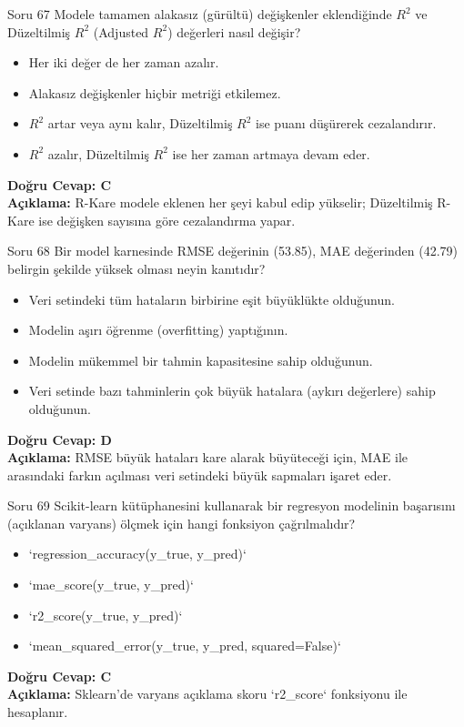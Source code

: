 \documentclass[12pt,a4paper]{article}
\begin{document}
\begin{testcard}{Soru 67}
    Modele tamamen alakasız (gürültü) değişkenler eklendiğinde $R^2$ ve Düzeltilmiş $R^2$ (Adjusted $R^2$) değerleri nasıl değişir?
    \begin{itemize}
        \item[A)] Her iki değer de her zaman azalır.
        \item[B)] Alakasız değişkenler hiçbir metriği etkilemez.
        \item[C)] $R^2$ artar veya aynı kalır, Düzeltilmiş $R^2$ ise puanı düşürerek cezalandırır.
        \item[D)] $R^2$ azalır, Düzeltilmiş $R^2$ ise her zaman artmaya devam eder.
    \end{itemize}
    \tcblower
    \textbf{Doğru Cevap: C} \\
    \textbf{Açıklama:} R-Kare modele eklenen her şeyi kabul edip yükselir; Düzeltilmiş R-Kare ise değişken sayısına göre cezalandırma yapar.
\end{testcard}

\begin{testcard}{Soru 68}
    Bir model karnesinde RMSE değerinin (53.85), MAE değerinden (42.79) belirgin şekilde yüksek olması neyin kanıtıdır?
    \begin{itemize}
        \item[A)] Veri setindeki tüm hataların birbirine eşit büyüklükte olduğunun.
        \item[B)] Modelin aşırı öğrenme (overfitting) yaptığının.
        \item[C)] Modelin mükemmel bir tahmin kapasitesine sahip olduğunun.
        \item[D)] Veri setinde bazı tahminlerin çok büyük hatalara (aykırı değerlere) sahip olduğunun.
    \end{itemize}
    \tcblower
    \textbf{Doğru Cevap: D} \\
    \textbf{Açıklama:} RMSE büyük hataları kare alarak büyüteceği için, MAE ile arasındaki farkın açılması veri setindeki büyük sapmaları işaret eder.
\end{testcard}

\begin{testcard}{Soru 69}
    Scikit-learn kütüphanesini kullanarak bir regresyon modelinin başarısını (açıklanan varyans) ölçmek için hangi fonksiyon çağrılmalıdır?
    \begin{itemize}
        \item[A)] `regression_accuracy(y_true, y_pred)`
        \item[B)] `mae_score(y_true, y_pred)`
        \item[C)] `r2_score(y_true, y_pred)`
        \item[D)] `mean_squared_error(y_true, y_pred, squared=False)`
    \end{itemize}
    \tcblower
    \textbf{Doğru Cevap: C} \\
    \textbf{Açıklama:} Sklearn'de varyans açıklama skoru `r2_score` fonksiyonu ile hesaplanır.
\end{testcard}
\end{document}

